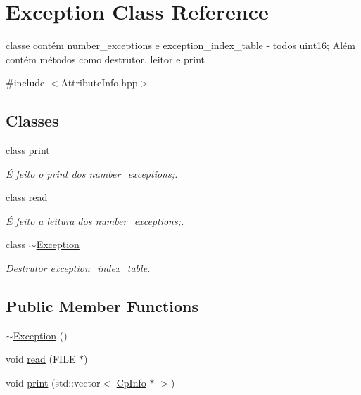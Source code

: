 \hypertarget{class_exception}{}\section{Exception Class Reference}
\label{class_exception}


classe contém number\+\_\+exceptions e exception\+\_\+index\+\_\+table -\/ todos uint16; Além contém métodos como destrutor, leitor e print  




{\ttfamily \#include $<$Attribute\+Info.\+hpp$>$}

\subsection*{Classes}
\begin{DoxyCompactItemize}
\item 
class \hyperlink{class_exception_1_1print}{print}
\begin{DoxyCompactList}\small\item\em É feito o print dos number\+\_\+exceptions;. \end{DoxyCompactList}\item 
class \hyperlink{class_exception_1_1read}{read}
\begin{DoxyCompactList}\small\item\em É feito a leitura dos number\+\_\+exceptions;. \end{DoxyCompactList}\item 
class \hyperlink{class_exception_1_1~_exception}{$\sim$\+Exception}
\begin{DoxyCompactList}\small\item\em Destrutor exception\+\_\+index\+\_\+table. \end{DoxyCompactList}\end{DoxyCompactItemize}
\subsection*{Public Member Functions}
\begin{DoxyCompactItemize}
\item 
\hyperlink{class_exception_a6b214cd8627d0968bdeebc1fbb9556b8}{$\sim$\+Exception} ()
\item 
void \hyperlink{class_exception_ad660b6215e7a9df9b2d4bc5216c828c4}{read} (F\+I\+LE $\ast$)
\item 
void \hyperlink{class_exception_a87cfd1bc8493cb4b22d9d92a07132779}{print} (std\+::vector$<$ \hyperlink{class_cp_info}{Cp\+Info} $\ast$ $>$)
\end{DoxyCompactItemize}
